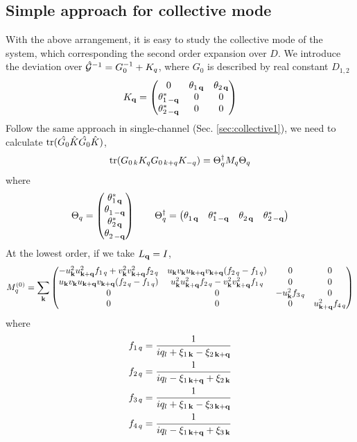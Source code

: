 \subsection{Simple approach for collective mode}
With the above arrangement, it is easy to study the collective mode of the system, which corresponding the second order expansion over $D$. We introduce the deviation over $\hat{\mathcal{G}}^{-1}=G_{0}^{-1}+K_{q}$, where $G_{0}$ is described by real constant $D_{1,2}$
\begin{equation}
K_{\mathbf{q}}=\begin{pmatrix}0&\theta_{1\,\mathbf{q}}&\theta_{2\,\mathbf{q}}\\\theta_{1\,-\mathbf{q}}^*&0&0\\\theta_{2\,-\mathbf{q}}^*&0&0\end{pmatrix}
\end{equation}
Follow the same approach in single-channel (Sec. \ref{sec:collective1}), we need to calculate $\text{tr}(\hat{G_{0}}\hat{K}\hat{G_{0}}\hat{K})$, 
\begin{equation}
\text{tr}({G_{0\,k}}{K_{q}}{G}_{0\,k+q}{K_{-q}})=\Theta_{q}^{\dagger}M_{q}\Theta_{q}
\end{equation}
where 
\begin{equation}
\Theta_{q}=\begin{pmatrix}\theta^{*}_{1\,\mathbf{q}}\\\theta^{}_{1\,-\mathbf{q}}\\\theta^{*}_{2\,\mathbf{q}}\\\theta^{}_{2\,-\mathbf{q}}\end{pmatrix}
\qquad
\Theta_{q}^{\dagger}=\begin{pmatrix}\theta^{}_{1\,\mathbf{q}}&\theta^{*}_{1\,-\mathbf{q}}&\theta^{}_{2\,\mathbf{q}}&\theta^{*}_{2\,-\mathbf{q}}\end{pmatrix}
\end{equation}
At the lowest order, if we take $L_{\mathbf{q}}=I$,
\begin{equation}
M^{(0)}_{q}=\sum_{\mathbf{k}}
\begin{pmatrix}
-u_{\mathbf{k}}^{2}u_{\mathbf{k}+\mathbf{q}}^{2}f_{1\,q}+v_{\mathbf{k}}^{2}v_{\mathbf{k}+\mathbf{q}}^{2}f_{2\,q}&u_{\mathbf{k}}v_{\mathbf{k}}u_{\mathbf{k}+\mathbf{q}}v_{\mathbf{k}+\mathbf{q}}(f_{2\,q}-f_{1\,q})&0&0\\
u_{\mathbf{k}}v_{\mathbf{k}}u_{\mathbf{k}+\mathbf{q}}v_{\mathbf{k}+\mathbf{q}}(f_{2\,q}-f_{1\,q})&u_{\mathbf{k}}^{2}u_{\mathbf{k}+\mathbf{q}}^{2}f_{2\,q}-v_{\mathbf{k}}^{2}v_{\mathbf{k}+\mathbf{q}}^{2}f_{1\,q}&0&0\\
0&0&-u_{\mathbf{k}}^{2}f_{3\,q}&0\\
0&0&0&u_{\mathbf{k}+\mathbf{q}}^{2}f_{4\,q}
\end{pmatrix}
\end{equation}
where
\begin{gather}
f_{1\,q}=\frac{1}{i q_{l}+\xi_{1\,\mathbf{k}}-\xi_{2\,\mathbf{k}+\mathbf{q}}}\\
f_{2\,q}=\frac{1}{i q_{l}-\xi_{1\,\mathbf{k}+\mathbf{q}}+\xi_{2\,\mathbf{k}}}\\
f_{3\,q}=\frac{1}{i q_{l}+\xi_{1\,\mathbf{k}}-\xi_{3\,\mathbf{k}+\mathbf{q}}}\\
f_{4\,q}=\frac{1}{i q_{l}-\xi_{1\,\mathbf{k}+\mathbf{q}}+\xi_{3\,\mathbf{k}}}
\end{gather}
